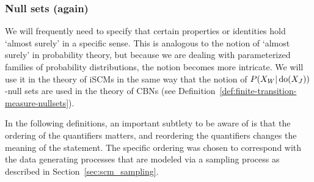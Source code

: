 \subsubsection{Null sets (again)}

We will frequently need to specify that certain properties or identities hold `almost surely' in a specific sense.
This is analogous to the notion of `almost surely' in probability theory, but because we are dealing with parameterized families of probability distributions, the notion becomes more intricate.
We will use it in the theory of iSCMs in the same way that the notion of $P(X_W|\operatorname{do}(X_J))$-null sets are used in the theory of CBNs (see Definition~\ref{def:finite-transition-measure-nullsets}).

In the following definitions, an important subtlety to be aware of is that the ordering of the quantifiers matters, and reordering the quantifiers changes the meaning of the statement. 
The specific ordering was chosen to correspond with the data generating processes that are modeled via a sampling process as described in Section~\ref{sec:scm_sampling}.

